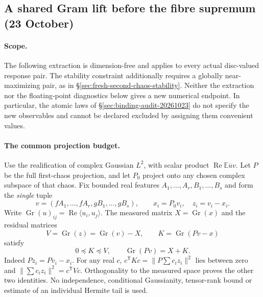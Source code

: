 \subsection{A shared Gram lift before the fibre supremum (23 October)}
\label{sec:shared-response-gram-lift}

\paragraph{Scope.}
The following extraction is dimension-free and applies to every actual
disc-valued response pair. The stability constraint additionally requires a
globally near-maximizing pair, as in
\S\ref{sec:fresh-second-chaos-stability}. Neither the extraction nor the
floating-point diagnostics below gives a new numerical endpoint. In particular,
the atomic laws of \S\ref{sec:binding-audit-20261023} do not specify the new
observables and cannot be declared excluded by assigning them convenient values.

\paragraph{The common projection budget.}
Use the realification of complex Gaussian $L^2$, with scalar product
$\operatorname{Re}\mathbb E\overline u v$. Let $P$ be the full first-chaos
projection, and let $P_0$ project onto any chosen complex subspace of that
chaos. Fix bounded real features $A_1,\ldots,A_r,B_1,\ldots,B_s$ and form the
\emph{single} tuple
\[
 v=(fA_1,\ldots,fA_r,gB_1,\ldots,gB_s),\qquad
 x_i=P_0v_i,\quad z_i=v_i-x_i.
\]
Write $\operatorname{Gr}(u)_{ij}=\operatorname{Re}\langle u_i,u_j\rangle$.
The measured matrix $X=\operatorname{Gr}(x)$ and the residual matrices
\[
 V=\operatorname{Gr}(z)=\operatorname{Gr}(v)-X,\qquad
 K=\operatorname{Gr}(Pv-x)
\]
satisfy
\begin{equation}\label{eq:shared-gram-interval}
 \boxed{0\preceq K\preceq V,\qquad
       \operatorname{Gr}(Pv)=X+K.}
\end{equation}
Indeed $Pz_i=Pv_i-x_i$. For any real $c$,
$c^{\mathsf T}Kc=\|P\sum c_i z_i\|^2$ lies between zero and
$\|\sum c_i z_i\|^2=c^{\mathsf T}Vc$. Orthogonality to the measured
space proves the other two identities. No independence, conditional
Gaussianity, tensor-rank bound or estimate of an individual Hermite tail is used.

